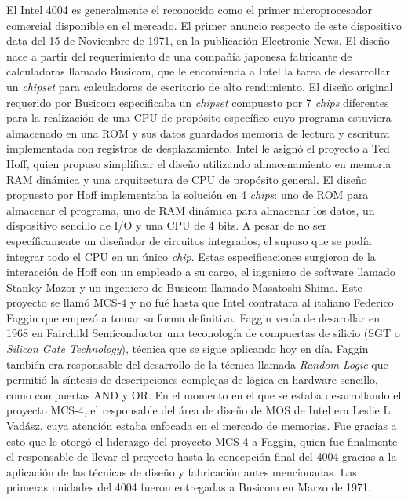 El Intel 4004 es generalmente el reconocido como el primer microprocesador
comercial disponible en el mercado. El primer anuncio respecto de este
dispositivo data del 15 de Noviembre de 1971, en la publicación Electronic News.
El diseño nace a partir del requerimiento de una compañía japonesa fabricante de
calculadoras llamado Busicom, que le encomienda a Intel la tarea de desarrollar
un \emph{chipset} para calculadoras de escritorio de alto rendimiento. El diseño
original requerido por Busicom especificaba un \emph{chipset} compuesto por 7
\emph{chips} diferentes para la realización de una CPU de propósito específico
cuyo programa estuviera almacenado en una ROM y sus datos guardados memoria de
lectura y escritura implementada con registros de desplazamiento. Intel le
asignó el proyecto a Ted Hoff, quien propuso simplificar el diseño utilizando
almacenamiento en memoria RAM dinámica y una arquitectura de CPU de propósito
general. El diseño propuesto por Hoff implementaba la solución en 4
\emph{chips}: uno de ROM para almacenar el programa, uno de RAM dinámica para
almacenar los datos, un dispositivo sencillo de I/O y una CPU de 4 bits. A pesar
de no ser específicamente un diseñador de circuitos integrados, el supuso que se
podía integrar todo el CPU en un único \emph{chip}. Estas especificaciones
surgieron de la interacción de Hoff con un empleado a su cargo, el ingeniero de
software llamado Stanley Mazor y un ingeniero de Busicom llamado Masatoshi
Shima. Este proyecto se llamó MCS-4 y no fué hasta que Intel contratara al
italiano Federico Faggin que empezó a tomar su forma definitiva. Faggin venía de
desarollar en 1968 en Fairchild Semiconductor una teconología de compuertas de
silicio (SGT o \emph{Silicon Gate Technology}), técnica que se sigue aplicando
hoy en día. Faggin también era responsable del desarrollo de la técnica llamada
\emph{Random Logic} que permitió la síntesis de descripciones complejas de
lógica en hardware sencillo, como compuertas AND y OR. En el momento en el que
se estaba desarrollando el proyecto MCS-4, el responsable del área de diseño de
MOS de Intel era Leslie L. Vadász, cuya atención estaba enfocada en el mercado
de memorias. Fue gracias a esto que le otorgó el liderazgo del proyecto MCS-4 a
Faggin, quien fue finalmente el responsable de llevar el proyecto hasta la
concepción final del 4004 gracias a la aplicación de las técnicas de diseño y
fabricación antes mencionadas. Las primeras unidades del 4004 fueron entregadas
a Busicom en Marzo de 1971.

